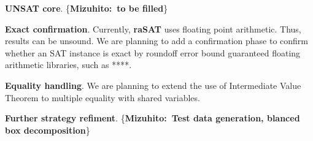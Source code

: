 \documentclass[runningheads,a4paper,oribibl]{llncs}
\newcommand{\suppress}[1]{} %
\newcommand{\mizuhito}[1]{\{{\bf Mizuhito:~\sf #1}\}} %
\begin{document}
\medskip \noindent 
{\bf UNSAT core}. 
\mizuhito{to be filled}

\medskip \noindent 
{\bf Exact confirmation}.
Currently, {\bf raSAT} uses floating point arithmetic. Thus, results can be unsound. 
We are planning to add a confirmation phase to confirm whether an SAT instance is exact
by roundoff error bound guaranteed floating arithmetic libraries, such as ****. 

\medskip \noindent 
{\bf Equality handling}. 
We are planning to extend the use of Intermediate Value Theorem to multiple equality with 
shared variables. 

\medskip \noindent 
{\bf Further strategy refiment}. 
\mizuhito{Test data generation, blanced box decomposition}


\suppress{
\subsubsection{Extension of {\bf raSAT} loop}
\begin{itemize}
\item {\bf Equality handling}: currently, {\bf raSAT} loop can handle only inequalities. 
Before applying ideal based technique, such as {\em Gr{\"o}bner basis}, 
we are planning to implement a non-constructive detection of equality 
by {\em intermediate value theorem}. 

\suppress{
\item{\textbf{Polynomial equality by Intermediate value theorem}:} 
Consider 
\begin{center}
$(x_1 \in (a_1,b_1) \wedge \cdots \wedge x_n \in (a_n,b_n))~\bigwedge 
\limits_{j}^m f_j(x_1,\cdots,x_n) > 0~\wedge~g(x_1,\cdots, x_n) = 0.$
\end{center}
SAT can be proved by two steps. First, find a box of the product of 
$(l_{ik},h_{ik}) \subseteq (l_i,h_i)$ (by interval arithmetic) such that 
\begin{center}
$\forall x_1 \in (l_{1k},h_{1k}) \cdots x_n \in (l_{nk},h_{nk}).~\bigwedge 
 \limits_{j}^m f_j(x_1,\cdots,x_n) > 0$~~~~(IA-VALID) 
\end{center}
and find two instances (by testing) in the box with $g(a_1,\cdots,a_n) > 0$ 
and $g(b_1,\cdots,b_n) < 0$. By Intermediate value theorem, we can conclude 
$\exists x_1 \in (l_1,h_1) \cdots x_n \in (l_n,h_n).~g(x_1,\cdots, x_n) = 0$. 
}

\item \textbf{Solving polynomial constraints on integers}: 
In integer domain, the number of test data is finite if interval constraints are bounded. 
Then, Test-UNSAT implies UNSAT if all possible test data are generated. 
A tight interaction between testing and interval decomposition could be investigated.
Mixed integers are also challenging. 
\end{itemize}


}
\end{document}
